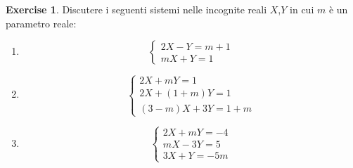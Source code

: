 \documentclass{article}
\theoremstyle{plain}
\theoremstyle{definition}
\newtheorem{xca}[exmp]{Exercise}
\theoremstyle{remark}
\begin{document}
\vspace{10pt}

\begin{bxthm}
\begin{xca}
    Discutere i seguenti sistemi nelle incognite reali $X$,$Y$ in cui $m$ è un parametro reale:
    \begin{enumerate}
        \item 
        \[
        \begin{cases}
            2X-Y=m+1\\
            mX+Y=1
        \end{cases}\]
        \item \[
        \begin{cases}
            2X+mY=1\\
            2X+(1+m)Y=1\\
            (3-m)X+3Y=1+m
        \end{cases}\]
        \item \[\begin{cases}
            2X+mY=-4\\
            mX-3Y=5\\
            3X+Y=-5m
        \end{cases}\]
    \end{enumerate}
\end{xca}
\end{bxthm}
\end{document}
